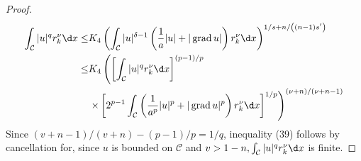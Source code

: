 \begin{proof}
  \[
  \begin{aligned}
  \int_{\mathcal{C}}|u|^q r_k^\nu \d x \leq & K_4\left(\int_{\mathcal{C}}|u|^{\delta-1}\left(\frac{1}{a}|u|+|\grad u|\right) r_k^\nu \d x\right)^{1 / s+n /\left((n-1) s^{\prime}\right)} \\
  \leq & K_4\left(\left[\int_{\mathcal{C}}|u|^q r_k^\nu \d x\right]^{(p-1) / p}\right. \\
  & \left.\times\left[2^{p-1} \int_{\mathcal{C}}\left(\frac{1}{a^p}|u|^p+|\grad u|^p\right) r_k^\nu \d x\right]^{1 / p}\right)^{(\nu+n) /(\nu+n-1)}
  \end{aligned}
  \]
  Since $(v+n-1) /(v+n)-(p-1) / p=1 / q$, inequality (39) follows by cancellation for, since $u$ is bounded on $\mathcal{C}$ and $v>1-n, \int_{\mathcal{C}}|u|^q r_k^\nu \d x$ is finite.
\end{proof}


